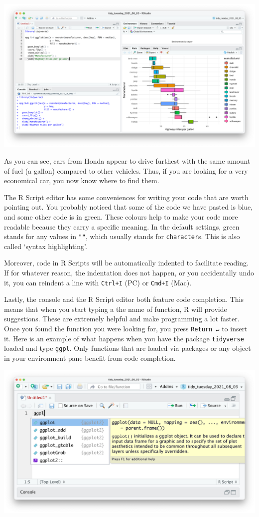 \documentclass[
]{book}
\begin{document}
\includegraphics{images/chapter_06_img/02_r_script/01_r_script_example_plot.png}

As you can see, cars from Honda appear to drive furthest with the same amount of fuel (a gallon) compared to other vehicles. Thus, if you are looking for a very economical car, you now know where to find them.

The R Script editor has some conveniences for writing your code that are worth pointing out. You probably noticed that some of the code we have pasted is blue, and some other code is in green. These colours help to make your code more readable because they carry a specific meaning. In the default settings, green stands for any values in \texttt{""}, which usually stands for \texttt{character}s. This is also called `syntax highlighting'.

Moreover, code in R Scripts will be automatically indented to facilitate reading. If for whatever reason, the indentation does not happen, or you accidentally undo it, you can reindent a line with \texttt{Ctrl+I} (PC) or \texttt{Cmd+I} (Mac).

Lastly, the console and the R Script editor both feature code completion. This means that when you start typing a the name of function, R will provide suggestions. These are extremely helpful and make programming a lot faster. Once you found the function you were looking for, you press \texttt{Return\ ↵} to insert it. Here is an example of what happens when you have the package \texttt{tidyverse} loaded and type \texttt{ggpl}. Only functions that are loaded via packages or any object in your environment pane benefit from code completion.

\includegraphics{images/chapter_06_img/02_r_script/02_r script_code_completion.png}
\end{document}
